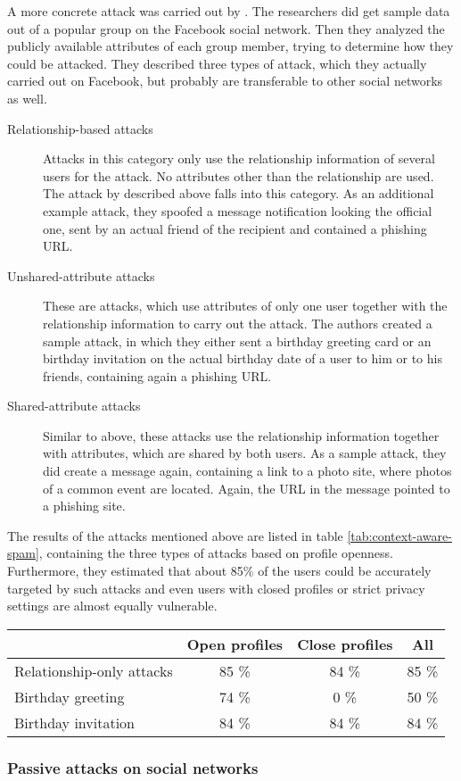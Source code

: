 A more concrete attack was carried out by \cite{brown2008}. The researchers
did get sample data out of a popular group on the Facebook social network. Then
they analyzed the publicly available attributes of each group member, trying to
determine how they could be attacked. They described three types of attack,
which they actually carried out on Facebook, but probably are transferable to
other social networks as well. 

\begin{description}
\item[Relationship-based attacks]
Attacks in this category only use the relationship information of several
users for the attack. No attributes other than the relationship are used. The
attack by \cite{jagatic2007} described above falls into this category. As an
additional example attack, they spoofed a message notification looking the
official one, sent by an actual friend of the recipient and contained a
phishing URL.

\item[Unshared-attribute attacks]
These are attacks, which use attributes of only one user together
with the relationship information to carry out the attack. The authors created
a sample attack, in which they either sent a birthday greeting card or an
birthday invitation on the actual birthday date of a user to him or to his
friends, containing again a phishing URL.

\item[Shared-attribute attacks]
Similar to above, these attacks use the relationship information together with
attributes, which are shared by both users. As a sample attack, they did create
a message again, containing a link to a photo site, where photos of a common
event are located. Again, the URL in the message pointed to a phishing site.
\end{description}

The results of the attacks mentioned above are listed in table
\ref{tab:context-aware-spam}, containing the three types of attacks based on
profile openness. Furthermore, they estimated that about 85\% of the users
could be accurately targeted by such attacks and even users with closed
profiles or strict privacy settings are almost equally vulnerable.

\begin{table*}[ht]
  \centering
  \begin{tabular}{@{}lccc@{}}
    \toprule
    & Open profiles & Close profiles & All\\
    \midrule
    Relationship-only attacks & 85 \% & 84 \% & 85 \% \\
    Birthday greeting         & 74 \% & 0 \% & 50 \% \\
    Birthday invitation       & 84 \% & 84 \% & 84 \% \\
    \bottomrule
  \end{tabular}
  \caption{Results of the case study of \cite{brown2008}}
  \label{tab:context-aware-spam}
\end{table*}

\subsubsection{Passive attacks on social networks}
